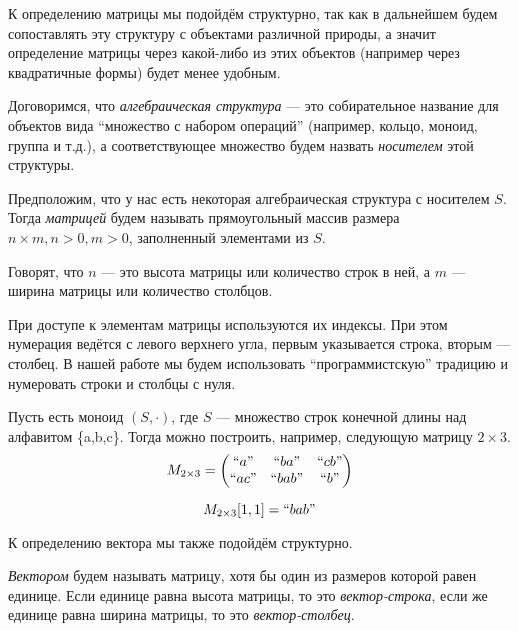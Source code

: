 К определению матрицы мы подойдём структурно, так как в дальнейшем будем сопоставлять эту структуру с объектами различной природы, а значит определение матрицы через какой-либо из этих объектов (например через квадратичные формы) будет менее удобным.

Договоримся, что \textit{алгебраическая структура} --- это собирательное название для объектов вида ``множество с набором операций'' (например, кольцо, моноид, группа и т.д.), а соответствующее множество будем назвать \textit{носителем} этой структуры.

\begin{definition}

	Предположим, что у нас есть некоторая алгебраическая структура с носителем $S$. Тогда \emph{матрицей} будем называть прямоугольный массив размера $n\times m, n > 0, m > 0$, заполненный элементами из $S$.

	Говорят, что $n$ --- это высота матрицы или количество строк в ней, а $m$ --- ширина матрицы или количество столбцов.

\end{definition}

При доступе к элементам матрицы используются их индексы. При этом нумерация ведётся с левого верхнего угла, первым указывается строка, вторым --- столбец. В нашей работе мы будем использовать ``программистскую'' традицию и нумеровать строки и столбцы с нуля.

\begin{example}[Матрица]

	Пусть есть моноид $(S,\cdot)$, где $S$ --- множество строк конечной длины над алфавитом \{a,b,c\}.
	Тогда можно построить, например, следующую матрицу $2\times 3$.
	$$
		M_{2\times 3} =
		\begin{pmatrix}
			``a"  & ``ba"  & ``cb" \\
			``ac" & ``bab" & ``b"  \\
		\end{pmatrix}
	$$

	$$
		M_{2\times 3}[1,1] = ``bab"
	$$

\end{example}

К определению вектора мы также подойдём структурно.

\begin{definition}

	\emph{Вектором} будем называть матрицу, хотя бы один из размеров которой равен единице. Если единице равна высота матрицы, то это \textit{вектор-строка}, если же единице равна ширина матрицы, то это \textit{вектор-столбец}.

\end{definition}


